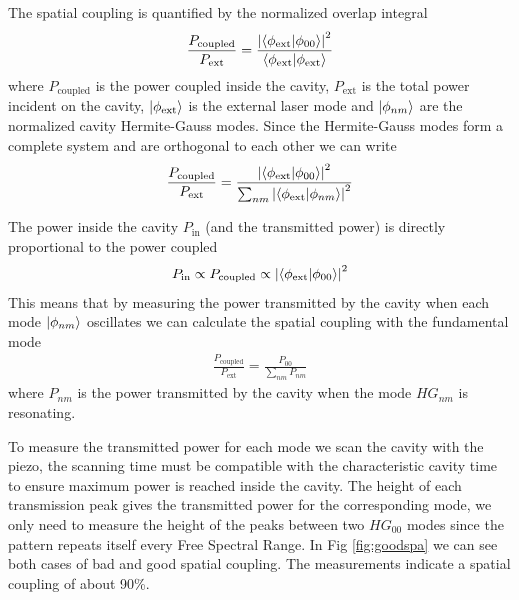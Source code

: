 The spatial coupling is quantified by the normalized overlap integral
\begin{align}
\frac{P_\mathrm{coupled}}{P_\mathrm{ext}} = \frac{	\left|\bra{\phi_\mathrm{ext}}\ket{\phi_{00}}\right|^2} {\bra{\phi_\mathrm{ext}}\ket{\phi_\mathrm{ext}}}
\end{align}
where $P_\mathrm{coupled}$ is the power coupled inside the cavity, $P_\mathrm{ext}$  is the total power incident on the cavity, $\ket{\phi_\mathrm{ext}}$ is the external laser mode and $\ket{\phi_{nm}}$ are the normalized cavity Hermite-Gauss modes. Since the Hermite-Gauss modes form a complete system and are orthogonal to each other we can write
\begin{align}
	\frac{P_\mathrm{coupled}}{P_\mathrm{ext}} = \frac{	\left|\bra{\phi_\mathrm{ext}}\ket{\phi_{00}}\right|^2} {\sum_{nm}\left|\bra{\phi_\mathrm{ext}}\ket{\phi_{nm}}\right|^2}
\end{align}

The power inside the cavity $P_\mathrm{in}$ (and the transmitted power) is directly proportional to the power coupled
\begin{align}
	P_\mathrm{in} \propto P_\mathrm{coupled} \propto \left|\bra{\phi_\mathrm{ext}}\ket{\phi_{00}}\right|^2
\end{align}
This means that by measuring the power transmitted by the cavity when each mode $\ket{\phi_{nm}}$ oscillates we can calculate the spatial coupling with the fundamental mode
\begin{align}
		\frac{P_\mathrm{coupled}}{P_\mathrm{ext}} = \frac{P_{00}}{\sum_{nm} P_{nm}}
\end{align}
where $P_{nm}$ is the power transmitted by the cavity when the mode $HG_{nm}$ is resonating.

To measure the transmitted power for each mode we scan the cavity with the piezo, the scanning time must be compatible with the characteristic cavity time to ensure maximum power is reached inside the cavity. The height of each transmission peak gives the transmitted power for the corresponding mode, we only need to measure the height of the peaks between two $HG_{00}$ modes since the pattern repeats itself every Free Spectral Range. In Fig \ref{fig:goodspa} we can see both cases of bad and good spatial coupling. The measurements indicate a spatial coupling of about 90\%.

